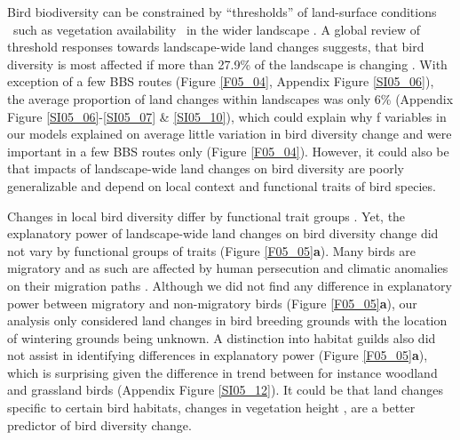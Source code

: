 Bird biodiversity can be constrained by “thresholds” of land-surface conditions \textendash\ such as vegetation availability \textendash\ in the wider landscape \citep{Andersen2009,Gutzwiller2015}. A global review of threshold responses towards landscape-wide land changes suggests, that bird diversity is most affected if more than 27.9\% of the landscape is changing \citep{Melo2018}. With exception of a few BBS routes (Figure \ref{F05_04}, Appendix Figure \ref{SI05_06}), the average proportion of land changes within landscapes was only 6\% (Appendix Figure \ref{SI05_06}-\ref{SI05_07} \& \ref{SI05_10}), which could explain why f variables in our models explained on average little variation in bird diversity change and were important in a few BBS routes only (Figure \ref{F05_04}). However, it could also be that impacts of landscape-wide land changes on bird diversity are poorly generalizable and depend on local context and functional traits of bird species. 

Changes in local bird diversity differ by functional trait groups \citep[Appendix Figure \ref{SI05_12},][]{Jarzyna2017,Barnagaud2017}. Yet, the explanatory power of landscape-wide land changes on bird diversity change did not vary by functional groups of traits (Figure \ref{F05_05}\textbf{a}). Many birds are migratory and as such are affected by human persecution and climatic anomalies on their migration paths \citep{Sanderson2006,Tottrup2012}. Although we did not find any difference in explanatory power between migratory and non-migratory birds (Figure \ref{F05_05}\textbf{a}), our analysis only considered land changes in bird breeding grounds with the location of wintering grounds being unknown. A distinction into habitat guilds also did not assist in identifying differences in explanatory power (Figure \ref{F05_05}\textbf{a}), which is surprising given the difference in trend between for instance woodland and grassland birds (Appendix Figure \ref{SI05_12}). It could be that land changes specific to certain bird habitats, \eg changes in vegetation height \citep{Goetz2014}, are a better predictor of bird diversity change. 

